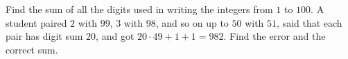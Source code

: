 Find the sum of all the digits used in writing the integers from $1$ to $100$. A student paired $2$ with $99$, $3$ with $98$, and so on up to $50$ with $51$, said that each pair has digit sum $20$, and got $20\cdot49+1+1=982$. Find the error and the correct sum.
